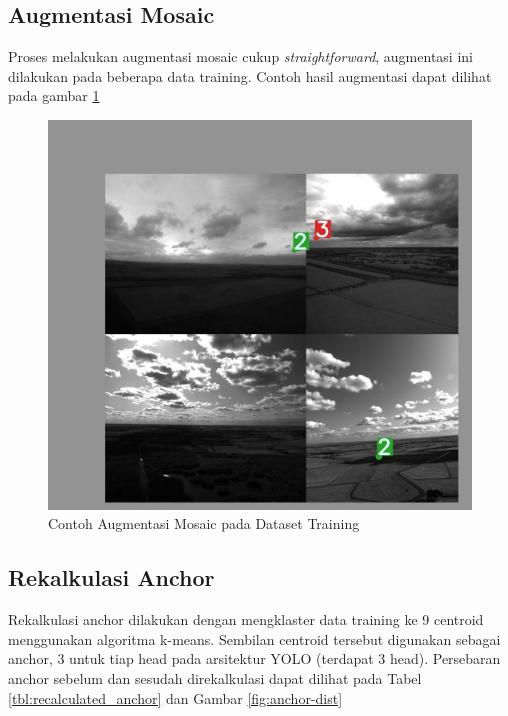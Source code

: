 \subsection{Augmentasi Mosaic}
  Proses melakukan augmentasi mosaic cukup \emph{straightforward},
  augmentasi ini dilakukan pada beberapa data training.
  Contoh hasil augmentasi dapat dilihat pada gambar \ref{fig:mosaic-train}
  \begin{figure}[ht]
    \centering
    \includegraphics[scale=0.4]{figures/mosaic-aug-2.png}
    \caption{Contoh Augmentasi Mosaic pada Dataset Training}
    \label{fig:mosaic-train}
  \end{figure}

\subsection{Rekalkulasi Anchor}
  Rekalkulasi anchor dilakukan dengan mengklaster data training ke 9 centroid menggunakan algoritma k-means.
  Sembilan centroid tersebut digunakan sebagai anchor, 3 untuk tiap head pada arsitektur YOLO (terdapat 3 head).
  Persebaran anchor sebelum dan sesudah direkalkulasi dapat dilihat 
  pada Tabel \ref{tbl:recalculated_anchor} dan Gambar \ref{fig:anchor-dist}

